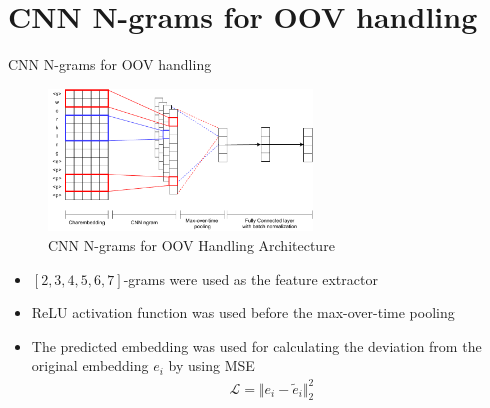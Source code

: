 \documentclass{beamer}
\begin{document}

\section{CNN N-grams for OOV handling}
\begin{frame}{CNN N-grams for OOV handling}
    \begin{figure}[H]
        \centering
        \includegraphics[width=70mm]{images/model_batchnorm}
        \caption{CNN N-grams for OOV Handling Architecture}
    \end{figure}
    \begin{itemize}
        \item $[2, 3, 4, 5, 6, 7]$-grams were used as the feature extractor
        \item ReLU activation function was used before the
        max-over-time pooling
        \item The predicted embedding was used for calculating the
        deviation from the original embedding $e_i$ by using MSE
        \begin{align*}
            \mathcal{L} = \Vert e_i - \tilde{e}_i \Vert^2_2
        \end{align*}
    \end{itemize}
\end{frame}

\end{document}
